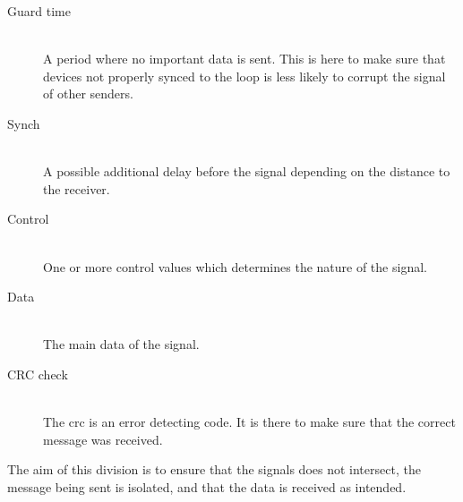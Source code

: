 \begin{description}
\item[Guard time] \hfill \\ 
A period where no important data is sent.
This is here to make sure that devices not properly synced to the loop is less likely to corrupt the signal of other senders.

\item[Synch] \hfill \\ 
A possible additional delay before the signal depending on the distance to the receiver.

\item[Control] \hfill \\
One or more control values which determines the nature of the signal.

\item[Data] \hfill \\
The main data of the signal.

\item[CRC check] \hfill \\
The \gls{crc} is an error detecting code. It is there to make sure that the correct message was received. 
\end{description}
\bigskip

The aim of this division is to ensure that the signals does not intersect, the message being sent is isolated, and that the data is received as intended.

